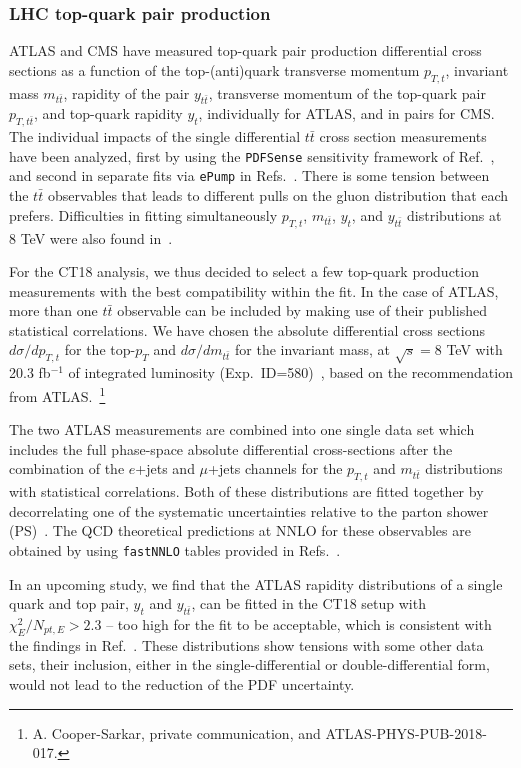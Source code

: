 \subsubsection{LHC top-quark pair production}
\label{sec:DataTop}

ATLAS and CMS have measured top-quark pair production differential cross sections as a function of the top-(anti)quark transverse momentum $p_{T,t}$, invariant mass $m_{t\bar{t}}$, rapidity of the pair $y_{t\bar{t}}$, transverse momentum of the top-quark pair $p_{T, t\bar{t}}$, and top-quark
rapidity $y_t$, individually for ATLAS, and in pairs for CMS. The individual impacts of the single differential $t\bar{t}$ cross section measurements have been analyzed, first by
using the \texttt{PDFSense} sensitivity framework of Ref.~\cite{Wang:2018heo}, and second in separate fits via \texttt{ePump} in Refs.~\cite{Hou:2019gfw,Hou:2019jxd}. There is some tension between the $t\bar t$ observables that leads to different pulls on the gluon distribution that each prefers. 
Difficulties in fitting simultaneously $p_{T,t}$, $m_{t\bar{t}}$, $y_{t}$, and $y_{t\bar{t}}$ distributions at 8 TeV were also found in~\cite{Bailey:2019yze,Hou:2019gfw,Hou:2019jxd}.

For the CT18 analysis, we thus decided to select a few top-quark production measurements with the best compatibility within the fit.  In the case of ATLAS, more than one $t\bar t$ observable can be included by making use of their published statistical correlations. We have chosen the  absolute differential cross sections $d\sigma/dp_{T,t}$ for the top-$p_T$ and $d\sigma/dm_{t\bar{t}}$ for the invariant mass, at $\sqrt{s}=8$ TeV with 20.3 fb$^{-1}$ of integrated luminosity (Exp.~ID=580)~\cite{Aad:2015mbv}, based on the recommendation from ATLAS.~\footnote{A. Cooper-Sarkar, private communication, and ATLAS-PHYS-PUB-2018-017.} 

The two ATLAS measurements are combined into one single data set which includes the full phase-space absolute differential cross-sections after the combination of the $e$+jets and
$\mu$+jets channels for the $p_{T,t}$ and $m_{t\bar{t}}$ distributions with statistical correlations. Both of these distributions are fitted together by decorrelating one of the
systematic uncertainties relative to the parton shower (PS)~\cite{Bogdan}. The QCD theoretical predictions at NNLO for these observables are obtained by
using \texttt{fastNNLO} tables provided in Refs.~\cite{Czakon:2017dip,fastnnlo:grids}.


 In an upcoming study, we find that the ATLAS rapidity distributions of a single quark and top pair, $y_t$ and $y_{t\bar t}$, can be fitted in the CT18 setup with $\chi^2_E/N_{pt,E}>2.3$ -- too high for the fit to be acceptable, which is consistent with the findings in Ref.~\cite{Kadir:2020yml}. These distributions show tensions with some other data sets, their inclusion, either in the single-differential or double-differential form, would not lead to the reduction of the PDF uncertainty. 

